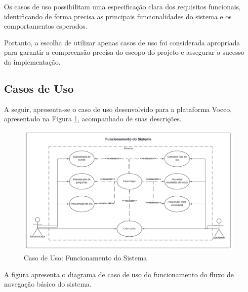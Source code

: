 Os casos de uso possibilitam uma especificação clara dos requisitos funcionais, identificando de forma precisa as principais funcionalidades do sistema e os comportamentos esperados. 

Portanto, a escolha de utilizar apenas casos de uso foi considerada apropriada para garantir a compreensão precisa do escopo do projeto e assegurar o sucesso da implementação.
\subsection{Casos de Uso}
A seguir, apresenta-se o caso de uso desenvolvido para a plataforma Vocco, apresentado na Figura \ref{casodeuso}, acompanhado de suas descrições. 


        
\begin{figure}[ht]
    \centering
    \includegraphics[scale=0.6]{images/caso-de-uso-funcionamento-sistema.png}
    \caption{Caso de Uso: Funcionamento do Sistema}
    \label{casodeuso}
\end{figure}  
A figura apresenta o diagrama de caso de uso do funcionamento do fluxo de navegação básico do sistema.
\newpage

